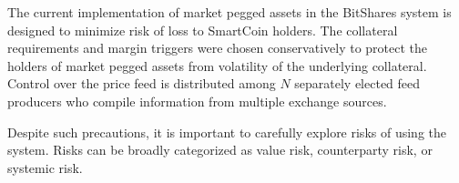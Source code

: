 The current implementation of market pegged assets in the BitShares system is
designed to minimize risk of loss to SmartCoin holders. The collateral
requirements and margin triggers were chosen conservatively to protect the
holders of market pegged assets from volatility of the underlying collateral.
Control over the price feed is distributed among $N$ separately elected feed
producers who compile information from multiple exchange sources.

Despite such precautions, it is important to carefully explore risks of using
the system. Risks can be broadly categorized as value risk, counterparty risk,
or systemic risk.
